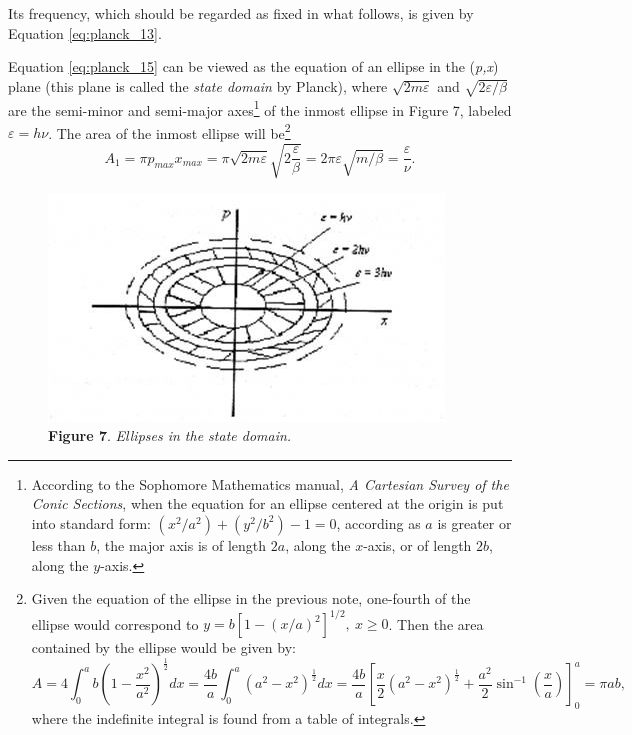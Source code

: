 Its frequency, which should be regarded as fixed in what follows, is
given by Equation \eqref{eq:planck_13}.

Equation \eqref{eq:planck_15} can be viewed as the equation of an ellipse in the
(\emph{p,x}) plane (this plane is called the \emph{state domain} by
Planck), where $\sqrt{2m\varepsilon}$ and $\sqrt{2\varepsilon/\beta}$ are the semi-minor and
semi-major axes\footnote{According to the Sophomore Mathematics manual,
  \emph{A Cartesian Survey of the Conic Sections}, when the equation for
  an ellipse centered at the origin is put into standard form:
  $(x^2/a^2) + (y^2/b^2) - 1 = 0$, according as
  $a$ is greater or less than $b$, the major axis is of
  length $2a$, along the $x$-axis, or of length $2b$,
  along the $y$-axis.} of the inmost ellipse in Figure 7, labeled
  $\varepsilon = h\nu$. The area of the inmost ellipse will be\footnote{Given
  the equation of the ellipse in the previous note, one-fourth of the
  ellipse would correspond to $y = b[1 - (x/a)^2]^{1/2},\ x \geq 0$.
Then the area contained by the ellipse would be given by:
\[A = 4\int_{0}^{a}b\left(1 - \frac{x^2}{a^2}\right)^{\frac{1}{2}}dx
= \frac{4b}{a}\int_{0}^{a}\left(a^2 - x^2\right)^{\frac{1}{2}}dx 
= \frac{4b}{a}\left[\frac{x}{2}\left(a^2 - x^2\right)^{\frac{1}{2}} 
+ \frac{a^2}{2}\sin^{- 1}\left(\frac{x}{a}\right)\right]_0^a = \pi ab,\]  where the indefinite integral is found from a table of integrals.}
%
\begin{equation}
A_1 = \pi p_{max}x_{max} = \pi\sqrt{2m\varepsilon}\sqrt{2\frac{\varepsilon}{\beta}} = 2\pi\varepsilon\sqrt{m/\beta} = \frac{\varepsilon}{\nu}. %
\end{equation}
%
\begin{figure}[h]
\centering
  \includegraphics[width=4.13542in,height=2.38542in]{images/05_planck/image050.jpg}
  \caption*{\textbf{Figure 7}. \emph{Ellipses in the state domain.}}
\end{figure}
